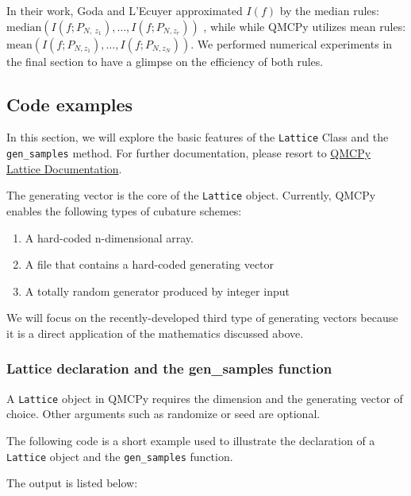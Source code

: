 In their work, Goda and L'Ecuyer approximated $I(f)$ by the median rules: $\textrm{median}(I(f;P_{N,\ z_1}),\dots,I(f;P_{N,z_r}))$ \cite{doi:10.1137/22M1473625}, while while QMCPy utilizes mean rules: $\textrm{mean}(I(f;P_{N,z_1}),\dots,I(f;P_{N,z_N}))$. We performed numerical experiments in the final section to have a glimpse on the efficiency of both rules. 

\subsection*{Code examples}
In this section, we will explore the basic features of the \verb|Lattice| Class and the \verb|gen_samples| method. For further documentation, please resort to \href{https://qmcpy.readthedocs.io/en/latest/algorithms.html#module-qmcpy.discrete_distribution.lattice.lattice}{QMCPy Lattice Documentation}.

The generating vector is the core of the \verb|Lattice| object. Currently, QMCPy enables the following types of cubature schemes:

\begin{enumerate}
    \item A hard-coded n-dimensional array. 
    \item A file that contains a hard-coded generating vector
    \item A totally random generator produced by integer input
\end{enumerate}

We will focus on the recently-developed third type of generating vectors because it is a direct application of the mathematics discussed above. 

\subsubsection*{Lattice declaration and the gen\_samples function}

A \verb|Lattice| object in QMCPy requires the dimension and the generating vector of choice. Other arguments such as randomize or seed are optional. 

The following code is a short example used to illustrate the declaration of a \verb|Lattice| object and the \verb|gen_samples| function.



The output is listed below:



